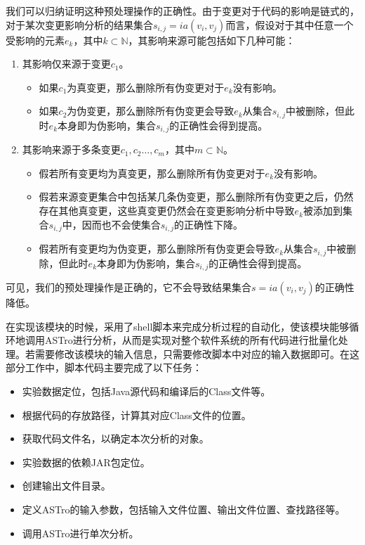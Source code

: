 我们可以归纳证明这种预处理操作的正确性。由于变更对于代码的影响是链式的，对于某次变更影响分析的结果集合$s_{i,j} = ia(v_i,v_j)$而言，假设对于其中任意一个受影响的元素$e_k$，其中$k \subset \mathbb{N}$，其影响来源可能包括如下几种可能：
\begin{enumerate}
	\item 其影响仅来源于变更$c_1$。
	\begin{itemize}
		\item 如果$c_1$为真变更，那么删除所有伪变更对于$e_k$没有影响。
		\item 如果$c_2$为伪变更，那么删除所有伪变更会导致$e_k$从集合$s_{i,j}$中被删除，但此时$e_k$本身即为伪影响，集合$s_{i,j}$的正确性会得到提高。
	\end{itemize}
	\item 其影响来源于多条变更$c_1,c_2\dots,c_m$，其中$m \subset \mathbb{N}$。
	\begin{itemize}
		\item 假若所有变更均为真变更，那么删除所有伪变更对于$e_k$没有影响。
		\item 假若来源变更集合中包括某几条伪变更，那么删除所有伪变更之后，仍然存在其他真变更，这些真变更仍然会在变更影响分析中导致$e_k$被添加到集合$s_{i,j}$中，因而也不会使集合$s_{i,j}$的正确性下降。
		\item 假若所有变更均为伪变更，那么删除所有伪变更会导致$e_k$从集合$s_{i,j}$中被删除，但此时$e_k$本身即为伪影响，集合$s_{i,j}$的正确性会得到提高。
	\end{itemize}
\end{enumerate}

可见，我们的预处理操作是正确的，它不会导致结果集合$s = ia(v_i,v_j)$的正确性降低。


在实现该模块的时候，采用了shell脚本来完成分析过程的自动化，使该模块能够循环地调用ASTro进行分析，从而是实现对整个软件系统的所有代码进行批量化处理。若需要修改该模块的输入信息，只需要修改脚本中对应的输入数据即可。在这部分工作中，脚本代码主要完成了以下任务：

\begin{itemize}
	\item 实验数据定位，包括Java源代码和编译后的Class文件等。
	\item 根据代码的存放路径，计算其对应Class文件的位置。
	\item 获取代码文件名，以确定本次分析的对象。
	\item 实验数据的依赖JAR包定位。
	\item 创建输出文件目录。
	\item 定义ASTro的输入参数，包括输入文件位置、输出文件位置、查找路径等。
	\item 调用ASTro进行单次分析。
\end{itemize}

